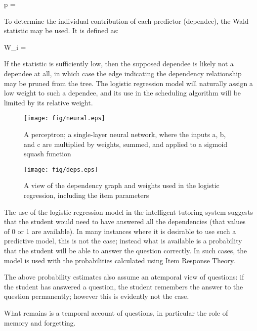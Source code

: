 \begin{equations}
  p = 
\end{equations}

To determine the individual contribution of each predictor (dependee), the
Wald statistic may be used.  It is defined as:

\begin{equations}
  W_i = 
\end{equations}

If the statistic is sufficiently low, then the supposed dependee is likely not
a dependee at all, in which case the edge indicating the dependency
relationship may be pruned from the tree.  The logistic regression model will
naturally assign a low weight to such a dependee, and its use in the scheduling
algorithm will be limited by its relative weight.

\begin{figure}[!p]
\label{fig:neural}
  \centering\texttt{[image: fig/neural.eps]}
\caption{A perceptron; a single-layer neural network, where the inputs a, b, and c
are multiplied by weights, summed, and applied to a sigmoid squash function}
\end{figure}

\begin{figure}[!p]
\label{fig:deps}
  \centering\texttt{[image: fig/deps.eps]}
\caption{A view of the dependency graph and weights used in the logistic regression,
including the item parameters}
\end{figure}

The use of the logistic regression model in the intelligent tutoring system
suggests that the student would need to have answered all the dependencies
(that values of 0 or 1 are available).  In many instances where it is desirable
to use such a predictive model, this is not the case; instead what is available
is a probability that the student will be able to answer the question
correctly.  In such cases, the model is used with the probabilities calculated
using Item Response Theory.

The above probability estimates also assume an atemporal view of questions: if
the student has answered a question, the student remembers the answer to the
question permanently; however this is evidently not the case.  

What remains is a temporal account of questions, in particular the role of
memory and forgetting.


